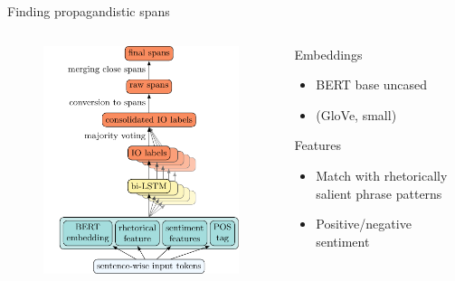 \documentclass[final]{beamer}
\newlength{\onecolwid}
\newlength{\twocolwid}
\begin{document}
\begin{frame}[t]
\begin{columns}[t]
\begin{column}{\twocolwid}
\begin{columns}[t,totalwidth=\twocolwid]
\begin{column}{\onecolwid}
\begin{block}{Finding propagandistic spans}
\begin{columns}[t,totalwidth=\onecolwid]
\begin{column}{0.145\paperwidth}
\vspace{-2.2em}
\begin{figure}
\includegraphics[width=1.25\textwidth,trim={5mm 0 0 0},clip]{task1-system.pdf}
\end{figure}
\end{column}
\begin{column}{0.155\paperwidth}
Embeddings
\begin{itemize}
    \item BERT base uncased \cite{devlin2019bert}
    \item (GloVe, small) \cite{pennington2014glove} 
\end{itemize}
Features
\begin{itemize}
    \item Match with rhetorically salient phrase patterns \cite{somasundaran2007detecting}
    \item Positive/negative sentiment \cite{baccianella2010sentiwordnet}

\end{itemize}
\end{column}
\end{columns}
\end{block}
\end{column}
\end{columns}
\end{column}
\end{columns}
\end{frame}
\end{document}
